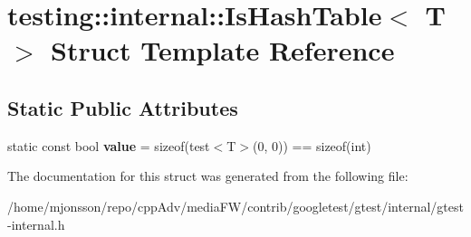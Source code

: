 \hypertarget{structtesting_1_1internal_1_1IsHashTable}{}\section{testing\+:\+:internal\+:\+:Is\+Hash\+Table$<$ T $>$ Struct Template Reference}
\label{structtesting_1_1internal_1_1IsHashTable}
\subsection*{Static Public Attributes}
\begin{DoxyCompactItemize}
\item 
\mbox{\label{structtesting_1_1internal_1_1IsHashTable_a165e0a3eddfa5fadf9b950be6432d848}} 
static const bool {\bfseries value} = sizeof(test$<$T$>$(0, 0)) == sizeof(int)
\end{DoxyCompactItemize}


The documentation for this struct was generated from the following file\+:\begin{DoxyCompactItemize}
\item 
/home/mjonsson/repo/cpp\+Adv/media\+F\+W/contrib/googletest/gtest/internal/gtest-\/internal.\+h\end{DoxyCompactItemize}
